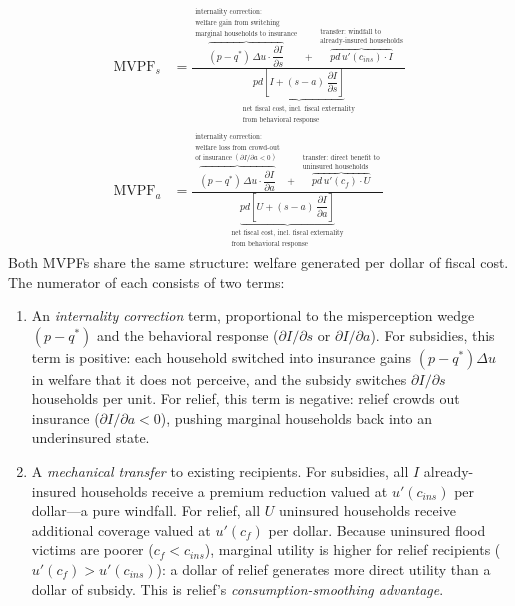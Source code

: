 \documentclass[12pt]{article}
\begin{document}
\begin{itemize}
    \begin{align}
        \text{MVPF}_s &= \frac{\overbrace{(p-q^*)\,\Delta u \cdot \dfrac{\partial I}{\partial s}}^{\substack{\text{internality correction:} \\ \text{welfare gain from switching} \\ \text{marginal households to insurance}}} \;+\; \overbrace{pd\,u'(c_{ins})\cdot I}^{\substack{\text{transfer: windfall to} \\ \text{already-insured households}}}}{\underbrace{pd\!\left[I + (s-a)\,\dfrac{\partial I}{\partial s}\right]}_{\substack{\text{net fiscal cost, incl.\ fiscal externality} \\ \text{from behavioral response}}}} \label{eq:mvpf_s} \\[14pt]
        \text{MVPF}_a &= \frac{\overbrace{(p-q^*)\,\Delta u \cdot \dfrac{\partial I}{\partial a}}^{\substack{\text{internality correction:} \\ \text{welfare loss from crowd-out} \\ \text{of insurance}\;(\partial I/\partial a < 0)}} \;+\; \overbrace{pd\,u'(c_f)\cdot U}^{\substack{\text{transfer: direct benefit to} \\ \text{uninsured households}}}}{\underbrace{pd\!\left[U + (s-a)\,\dfrac{\partial I}{\partial a}\right]}_{\substack{\text{net fiscal cost, incl.\ fiscal externality} \\ \text{from behavioral response}}}} \label{eq:mvpf_a}
    \end{align}
    Both MVPFs share the same structure: welfare generated per dollar of fiscal cost. The numerator of each consists of two terms:
    \begin{enumerate}
        \item An \emph{internality correction} term, proportional to the misperception wedge $(p - q^*)$ and the behavioral response ($\partial I / \partial s$ or $\partial I / \partial a$). For subsidies, this term is positive: each household switched into insurance gains $(p-q^*)\Delta u$ in welfare that it does not perceive, and the subsidy switches $\partial I/\partial s$ households per unit. For relief, this term is negative: relief crowds out insurance ($\partial I/\partial a < 0$), pushing marginal households back into an underinsured state.
        \item A \emph{mechanical transfer} to existing recipients. For subsidies, all $I$ already-insured households receive a premium reduction valued at $u'(c_{ins})$ per dollar---a pure windfall. For relief, all $U$ uninsured households receive additional coverage valued at $u'(c_f)$ per dollar. Because uninsured flood victims are poorer ($c_f < c_{ins}$), marginal utility is higher for relief recipients ($u'(c_f) > u'(c_{ins})$): a dollar of relief generates more direct utility than a dollar of subsidy. This is relief's \emph{consumption-smoothing advantage}.

\end{enumerate}
\end{itemize}
\end{document}
